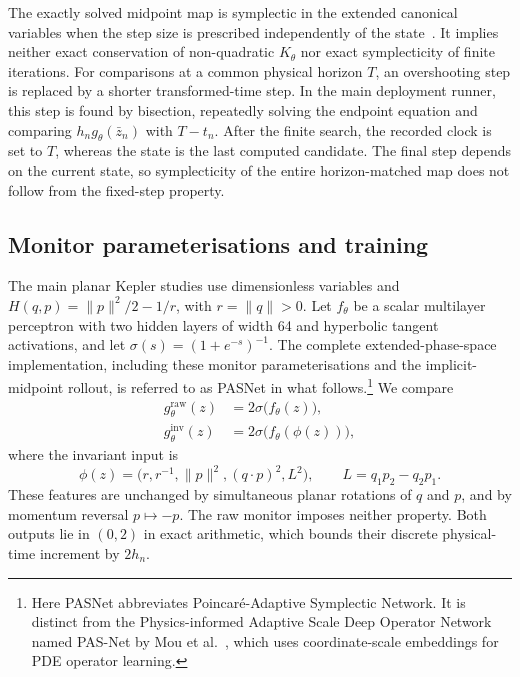 \documentclass[final,3p,times]{elsarticle}
\begin{document}
The exactly solved midpoint map is symplectic in the extended canonical
variables when the step size is prescribed independently of the
state~\cite{Hairer2006}.
It implies neither exact conservation of non-quadratic $K_\theta$ nor
exact symplecticity of finite iterations.
For comparisons at a common physical horizon $T$, an overshooting step is
replaced by a shorter transformed-time step. In the main deployment runner,
this step is found by bisection, repeatedly solving the endpoint equation
and comparing $h_n g_\theta(\bar z_n)$ with $T-t_n$. After the finite search,
the recorded clock is set to $T$, whereas the state is the last computed
candidate. The final step depends on the current state, so symplecticity of the entire
horizon-matched map does not follow from the fixed-step property.

\subsection{Monitor parameterisations and training}
\label{sec:monitor-training}
The main planar Kepler studies use dimensionless variables and
$H(q,p)=\|p\|^2/2-1/r$, with $r=\|q\|>0$. Let $f_\theta$ be a scalar
multilayer perceptron with two hidden layers of width 64 and hyperbolic
tangent activations, and let $\sigma(s)=(1+e^{-s})^{-1}$.
The complete extended-phase-space implementation, including these monitor
parameterisations and the implicit-midpoint rollout, is referred to as
PASNet in what follows.\footnote{Here PASNet abbreviates
Poincar\'e-Adaptive Symplectic Network. It is distinct from the
Physics-informed Adaptive Scale Deep Operator Network named PAS-Net
by Mou et al.~\cite{Mou2025PAS}, which uses coordinate-scale embeddings
for PDE operator learning.}
We compare
\begin{align}
 g_\theta^{\mathrm{raw}}(z)&=2\sigma\bigl(f_\theta(z)\bigr),
 \label{eq:raw-monitor}\\
 g_\theta^{\mathrm{inv}}(z)&=2\sigma\bigl(f_\theta(\phi(z))\bigr),
 \label{eq:invariant-monitor}
\end{align}
where the invariant input is
\begin{equation}
 \phi(z)=\bigl(r,r^{-1},\|p\|^2,(q\cdot p)^2,L^2\bigr),
 \qquad L=q_1p_2-q_2p_1.
 \label{eq:invariant-features}
\end{equation}
These features are unchanged by simultaneous planar rotations of $q$ and
$p$, and by momentum reversal $p\mapsto-p$. The raw monitor imposes neither
property. Both outputs lie in $(0,2)$ in exact arithmetic, which bounds
their discrete physical-time increment by $2h_n$.
\end{document}
